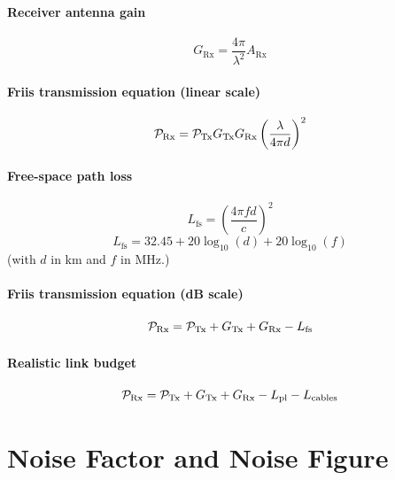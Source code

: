 \paragraph{Receiver antenna gain}
\begin{equation}
G_{\textrm{Rx}} = \frac{4 \pi}{\lambda^2} A_{\textrm{Rx}}
\label{eq:receiverAntennaGain}
\end{equation}

\paragraph{Friis transmission equation (linear scale)}
\begin{equation}
{\cal P}_{\textrm{Rx}}  = {\cal P}_{\textrm{Tx}}  G_{\textrm{Tx}} G_{\textrm{Rx}}  \left( \frac{\lambda}{4 \pi d} \right)^2
\label{eq:frissInLinearScale}
\end{equation}

\paragraph{Free-space path loss}
\[
L_{\textrm{fs}} = \left( \frac{4 \pi f d}{c} \right)^2
\]
\begin{equation}
L_{\textrm{fs}} = 32.45 + 20 \log_{10}(d) + 20 \log_{10}(f)
\label{eq:freeSpacePathLoss}
\end{equation}
(with $d$ in km and $f$ in MHz.)

\paragraph{Friis transmission equation (dB scale)}
\begin{equation}
{\cal P}_{\textrm{Rx}} = {\cal P}_{\textrm{Tx}} + G_{\textrm{Tx}} + G_{\textrm{Rx}} - L_{\textrm{fs}}
\label{eq:friisTransmissionEq}
\end{equation}

\paragraph{Realistic link budget}
\begin{equation}
{\cal P}_{\textrm{Rx}} = {\cal P}_{\textrm{Tx}} + G_{\textrm{Tx}} + G_{\textrm{Rx}} - L_{\textrm{pl}}  - L_{\text{cables}}
\label{eq:realisticLinkBudget}
\end{equation}

\section*{Noise Factor and Noise Figure}

